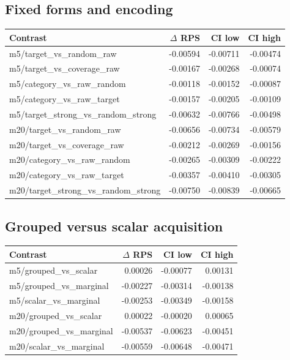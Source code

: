 \documentclass[10pt]{article}
\begin{document}
\subsection{Fixed forms and encoding}
\begin{longtable}{p{.49\linewidth}rrr}\toprule Contrast & $\Delta$ RPS & CI low & CI high\\\midrule\endhead
m5/target\_vs\_random\_raw & -0.00594 & -0.00711 & -0.00474\\
m5/target\_vs\_coverage\_raw & -0.00167 & -0.00268 & -0.00074\\
m5/category\_vs\_raw\_random & -0.00118 & -0.00152 & -0.00087\\
m5/category\_vs\_raw\_target & -0.00157 & -0.00205 & -0.00109\\
m5/target\_strong\_vs\_random\_strong & -0.00632 & -0.00766 & -0.00498\\
m20/target\_vs\_random\_raw & -0.00656 & -0.00734 & -0.00579\\
m20/target\_vs\_coverage\_raw & -0.00212 & -0.00269 & -0.00156\\
m20/category\_vs\_raw\_random & -0.00265 & -0.00309 & -0.00222\\
m20/category\_vs\_raw\_target & -0.00357 & -0.00410 & -0.00305\\
m20/target\_strong\_vs\_random\_strong & -0.00750 & -0.00839 & -0.00665\\
\bottomrule\end{longtable}
\subsection{Grouped versus scalar acquisition}
\begin{longtable}{p{.49\linewidth}rrr}\toprule Contrast & $\Delta$ RPS & CI low & CI high\\\midrule\endhead
m5/grouped\_vs\_scalar & 0.00026 & -0.00077 & 0.00131\\
m5/grouped\_vs\_marginal & -0.00227 & -0.00314 & -0.00138\\
m5/scalar\_vs\_marginal & -0.00253 & -0.00349 & -0.00158\\
m20/grouped\_vs\_scalar & 0.00022 & -0.00020 & 0.00065\\
m20/grouped\_vs\_marginal & -0.00537 & -0.00623 & -0.00451\\
m20/scalar\_vs\_marginal & -0.00559 & -0.00648 & -0.00471\\
\bottomrule\end{longtable}
\end{document}
